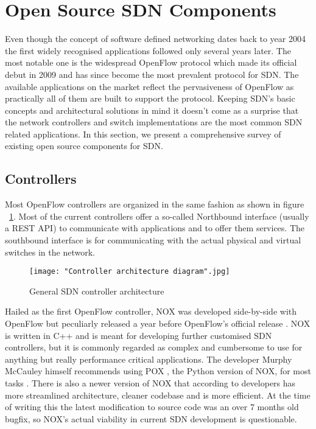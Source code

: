 \section{Open Source SDN Components}

Even though the concept of software defined networking dates back to year 2004 \cite{robert2012system} the first widely recognised applications followed only several years later. The most notable one is the widespread OpenFlow protocol \cite{OpenFlow1.0.0} which made its official debut in 2009 and has since become the most prevalent protocol for SDN.  The available applications on the market reflect the pervasiveness of OpenFlow as practically all of them are built to support the protocol. Keeping SDN’s basic concepts and architectural solutions in mind it doesn’t come as a surprise that the network controllers and switch implementations are the most common SDN related applications. In this section, we present a comprehensive survey of existing open source components for SDN.

\subsection{Controllers}

Most OpenFlow controllers are organized in the same fashion as shown in figure ~\ref{fig:architecture}. Most of the current controllers offer a so-called Northbound interface (usually a REST API) to communicate with applications and to offer them services. The southbound interface is for communicating with the actual physical and virtual switches in the network.

\begin{figure}[ht!]
\centering
{}
\texttt{[image: "Controller architecture diagram".jpg]}
\caption{General SDN controller architecture}
\label{fig:architecture}
\end{figure}

	Hailed as the first OpenFlow controller, NOX was developed side-by-side with OpenFlow but peculiarly released a year before OpenFlow’s official release \cite{NOX}. NOX is written in C++ and is meant for developing further customised SDN controllers, but it is commonly regarded as complex and cumbersome to use for anything but really performance critical applications. The developer Murphy McCauley himself recommends using POX \cite{POX}, the Python version of NOX, for most tasks \cite{CHU12}. There is also a newer version of NOX that according to developers has more streamlined architecture, cleaner codebase and is more efficient. At the time of writing this the latest modification to source code was an over 7 months old bugfix, so NOX’s actual viability in current SDN development is questionable.

